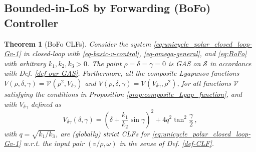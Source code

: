 \documentclass[journal,twoside,web]{ieeecolor}
\newtheorem{theorem}{Theorem}
\theoremstyle{definition}
\begin{document}
\subsection{Bounded-in-LoS by Forwarding (BoFo) Controller}

\begin{theorem}[BoFo CLFs] 
\label{thm:CLF_BoFo}
Consider the system \eqref{eq:unicycle_polar_closed_loop-Gv-1} in closed-loop with \eqref{eq-basic-v-control}, \eqref{eq-omega-general}, and \eqref{eq:BoFo} with arbitrary $k_1, k_2, k_3 > 0$.
The point $\rho = \delta = \gamma = 0$ is GAS on $\mathcal{S}$ in accordance with Def. \ref{def-our-GAS}.
Furthermore, all the composite Lyapunov functions $V(\rho, \delta, \gamma) = \mathcal{V}(\rho^2, V_{\delta \gamma})$ and $V(\rho, \delta, \gamma) = \mathcal{V}(V_{\delta \gamma},\rho^2)$, for all functions $\mathcal{V}$ satisfying the conditions in Proposition \ref{prop:composite_Lyap_function}, and with $V_{\delta \gamma}$ defined as
\begin{equation}
V_{\delta \gamma}(\delta, \gamma)  = 
\left(\delta + \frac{k_1}{k_2} \sin \gamma \right)^2+ 4q^2 \tan ^2\frac{\gamma}{2} 
\,,\label{eq:CLF_BoFo_gamma_delta}
\end{equation}
with $q = \sqrt{k_1/k_3}$, are (globally) strict CLFs for \eqref{eq:unicycle_polar_closed_loop-Gv-1} w.r.t. the input pair $(v/\rho,\omega)$ in the sense of Def. \ref{def-CLF}. 
\end{theorem}
\end{document}
